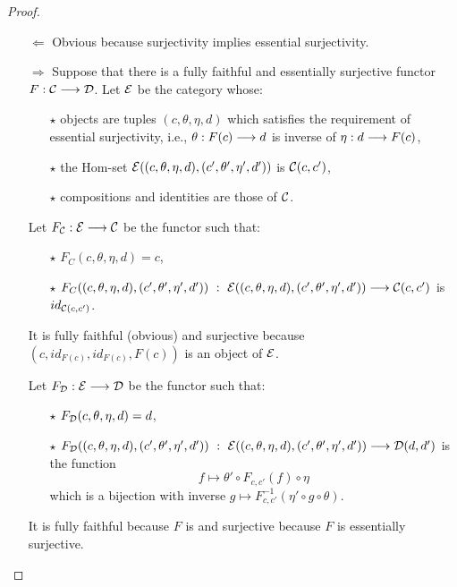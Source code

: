 	\begin{proof}~
	\begin{itemize}
		\item[$\Leftarrow$] Obvious because surjectivity implies essential surjectivity.
		\item[$\Rightarrow$] Suppose that there is a fully faithful and essentially surjective functor $F : \mathcal{C} \longrightarrow \mathcal{D}$. Let $\mathcal{E}$ be the category whose:
		\begin{itemize}
			\item[$\star$] objects are tuples $(c,\theta,\eta,d)$ which satisfies the requirement of essential surjectivity, i.e., $\theta : F(c) \longrightarrow d$ is inverse of $\eta : d \longrightarrow F(c)$,
			\item[$\star$] the Hom-set $\mathcal{E}((c,\theta,\eta,d),(c',\theta',\eta',d'))$ is $\mathcal{C}(c,c')$,
			\item[$\star$] compositions and identities are those of $\mathcal{C}$.
		\end{itemize}
Let $F_{\mathcal{C}} : \mathcal{E} \longrightarrow \mathcal{C}$ be the functor such that:
		\begin{itemize}
			\item[$\star$] $F_C(c,\theta,\eta,d) = c$,
			\item[$\star$] $F_C((c,\theta,\eta,d),(c',\theta',\eta',d')) ~:~ {\mathcal{E}((c,\theta,\eta,d),(c',\theta',\eta',d'))}\longrightarrow {\mathcal{C}(c,c')}$ is $id_{\mathcal{C}(c,c')}$.
		\end{itemize}
It is fully faithful (obvious) and surjective because $(c,id_{F(c)},id_{F(c)},F(c))$ is an object of $\mathcal{E}$.

Let $F_{\mathcal{D}} : \mathcal{E} \longrightarrow \mathcal{D}$ be the functor such that:
		\begin{itemize}
			\item[$\star$] $F_{\mathcal{D}}(c,\theta,\eta,d) = d$,
			\item[$\star$] ${F_{\mathcal{D}}((c,\theta,\eta,d),(c',\theta',\eta',d'))} ~:~ {\mathcal{E}((c,\theta,\eta,d),(c',\theta',\eta',d'))}\longrightarrow {\mathcal{D}(d,d')}$ is the function $$f \longmapsto \theta'\circ F_{c,c'}(f)\circ \eta$$ which is a bijection with inverse $g \longmapsto F_{c,c'}^{-1}(\eta'\circ g\circ\theta)$.
		\end{itemize}
		It is fully faithful because $F$ is and surjective because $F$ is essentially surjective.
\end{itemize}
\end{proof}



